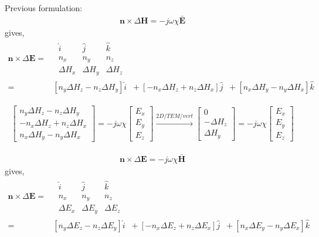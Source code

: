 \documentclass{article}
\newcommand{\E}{\mathbf{E}}
\renewcommand{\H}{\mathbf{H}}
\newcommand{\Hb}{\mathbf{\bar H}}
\newcommand{\Eb}{\mathbf{\bar E}}
\newcommand{\n}{\mathbf{n}}
\newcommand{\DE}{\Delta \E}
\newcommand{\dE}{\Delta E}
\newcommand{\dH}{\Delta H}
\renewcommand{\H}{\mathbf{H}}
\newcommand{\0}{\varnothing}
\begin{document}
Previous formulation:
\begin{align*}
	\n \times \Delta \H = -j \omega \chi\Eb
\end{align*}
gives,
\begin{align*}
    \n \times \DE = &\;\begin{array}{|ccc|}
    \hat i & \hat j & \hat k\\
    n_x & n_y & n_z     \\
     \dH_x& \dH_y & \dH_z
    \end{array}\\
     = &\left[n_y \dH_z - n_z \dH_y \right] \hat i \;\; + 
	   \left[-n_x \dH_z + n_z \dH_x\right] \hat j \;\; + 
	   \left[n_x \dH_y - n_y \dH_x\right] \hat k
\end{align*}

\begin{align*}
	\left[
    \begin{array}{c}
	n_y \dH_z - n_z \dH_y\\ 
	-n_x \dH_z + n_z \dH_x\\
	n_x \dH_y - n_y \dH_x
	\end{array} \right] = 
	-j \omega \chi 
	\left[
    \begin{array}{c}
     E_x\\
     E_y\\
	 E_z
	 \end{array} \right]
	 \xrightarrow{2D/TEM/vert}
    \left[
    \begin{array}{c}
	0\\ 
	-\dH_z\\
	\dH_y
	\end{array} \right] = 
	-j \omega \chi 
	\left[
    \begin{array}{c}
     E_x\\
     E_y\\
	 E_z
	 \end{array} \right]
\end{align*}

\begin{align*}
	\n \times \Delta \E = -j \omega \chi\Hb
\end{align*}
gives,
\begin{align*}
    \n \times \DE = &\;\begin{array}{|ccc|}
    \hat i & \hat j & \hat k\\
    n_x & n_y & n_z     \\
     \dE_x& \dE_y & \dE_z
    \end{array}\\
     = &\left[n_y \dE_z - n_z \dE_y \right] \hat i \;\; + 
	   \left[-n_x \dE_z + n_z \dE_x\right] \hat j \;\; + 
	   \left[n_x \dE_y - n_y \dE_x\right] \hat k
\end{align*}
\end{document}
